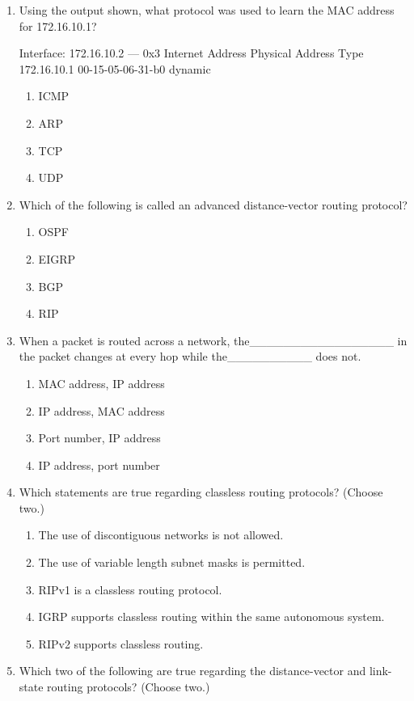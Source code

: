 \begin{enumerate}
\begin{enumerate}
    \begin{figure}
    \centering
    \caption{}
    \end{figure}
  \end{enumerate}
\item
  Using the output shown, what protocol was used to learn the MAC
  address for 172.16.10.1?

\begin{cli}
Interface: 172.16.10.2 --- 0x3
  Internet Address      Physical Address      Type
  172.16.10.1          00-15-05-06-31-b0     dynamic
\end{cli}

  \begin{enumerate}
  \item
    ICMP
  \item
    ARP
  \item
    TCP
  \item
    UDP
  \end{enumerate}
\item
  Which of the following is called an advanced distance-vector routing
  protocol?

  \begin{enumerate}
  \item
    OSPF
  \item
    EIGRP
  \item
    BGP
  \item
    RIP
  \end{enumerate}
\item
  When a packet is routed across a network,
  the\_\_\_\_\_\_\_\_\_\_\_\_\_\_\_\_\_ in the packet changes at every
  hop while the\_\_\_\_\_\_\_\_\_\_ does not.

  \begin{enumerate}
  \item
    MAC address, IP address
  \item
    IP address, MAC address
  \item
    Port number, IP address
  \item
    IP address, port number
  \end{enumerate}
\item
  \protect\hypertarget{c09.xhtmlux5cux23Page_407}{}{}Which statements
  are true regarding classless routing protocols? (Choose two.)

  \begin{enumerate}
  \item
    The use of discontiguous networks is not allowed.
  \item
    The use of variable length subnet masks is permitted.
  \item
    RIPv1 is a classless routing protocol.
  \item
    IGRP supports classless routing within the same autonomous system.
  \item
    RIPv2 supports classless routing.
  \end{enumerate}
\item
  Which two of the following are true regarding the distance-vector and
  link-state routing protocols? (Choose two.)


\end{enumerate}
